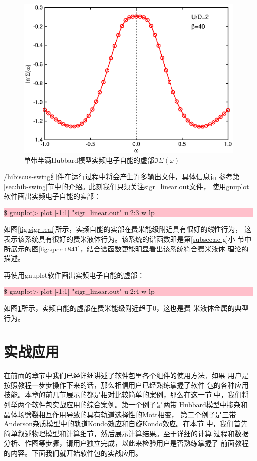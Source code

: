 \begin{figure}
\centering
\includegraphics{figure/sigr-img.eps}
\caption{单带半满Hubbard模型实频电子自能的虚部$\Im \Sigma (\omega)$} 
\label{fig:sigr-img}
\end{figure}

{\hibiscus}/hibiscus-swing组件在运行过程中将会产生许多输出文件，具体信息请
参考第\ref{sec:hib-swing}节中的介绍。此刻我们只须关注sigr\_linear.out文件，
使用gnuplot软件画出实频电子自能的实部：

\noindent\colorbox{pink}{\parbox[r]{\linewidth}{\quad \$ gnuplot> plot [-1:1] "sigr\_linear.out" u 2:3 w lp }}

如图\ref{fig:sigr-real}所示，实频自能的实部在费米能级附近具有很好的线性行为，
这表示该系统具有很好的费米液体行为。该系统的谱函数即是第\ref{subsec:ac-g}小
节中所展示的图\ref{fig:spec-t841}，结合谱函数更能明显看出该系统符合费米液体
理论的描述。

再使用gnuplot软件画出实频电子自能的虚部：

\noindent\colorbox{pink}{\parbox[r]{\linewidth}{\quad \$ gnuplot> plot [-1:1] "sigr\_linear.out" u 2:4 w lp }}

如图\ref{fig:sigr-img}所示，实频自能的虚部在费米能级附近趋于0，这也是费
米液体金属的典型行为。

\section{{\iqist}实战应用}
\label{sec:project}

在前面的章节中我们已经详细讲述了{\iqist}软件包里各个组件的使用方法，如果
用户是按照教程一步步操作下来的话，那么相信用户已经熟练掌握了{\iqist}软件
包的各种应用技能。本章的前几节展示的都是相对比较简单的案例，那么在这一节
中，我们将列举两个{\iqist}软件包实战应用的综合案例。第一个例子是两带
Hubbard模型中掺杂和晶体场劈裂相互作用导致的具有轨道选择性的Mott相变，
第二个例子是三带Anderson杂质模型中的轨道Kondo效应和自旋Kondo效应。在本节
中，我们首先简单叙述物理模型和计算细节，然后展示计算结果。至于详细的计算
过程和数据分析、作图等步骤，请用户独立完成，以此来检验用户是否熟练掌握了
前面教程的内容。下面我们就开始{\iqist}软件包的实战应用。

